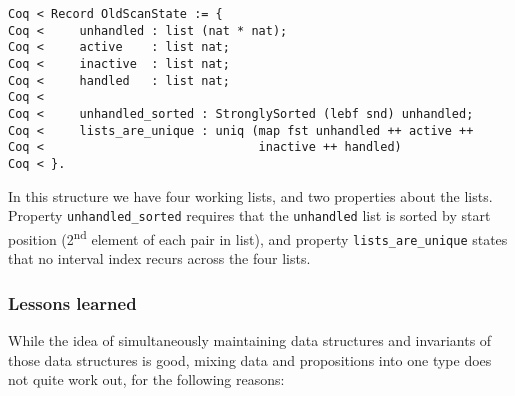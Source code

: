 \documentclass{llncs}
\begin{document}
\begin{flushleft}
\texttt{Coq~{<}~Record~OldScanState~:=~\{}\\
\texttt{Coq~{<}~~~~~unhandled~:~list~(nat~*~nat);}\\
\texttt{Coq~{<}~~~~~active~~~~:~list~nat;}\\
\texttt{Coq~{<}~~~~~inactive~~:~list~nat;}\\
\texttt{Coq~{<}~~~~~handled~~~:~list~nat;}\\
\texttt{Coq~{<}~}\\
\texttt{Coq~{<}~~~~~unhandled\_sorted~:~StronglySorted~(lebf~snd)~unhandled;}\\
\texttt{Coq~{<}~~~~~lists\_are\_unique~:~uniq~(map~fst~unhandled~++~active~++}\\
\texttt{Coq~{<}~~~~~~~~~~~~~~~~~~~~~~~~~~~~~~inactive~++~handled)}\\
\texttt{Coq~{<}~\}.}\\
\end{flushleft}

In this structure we have four working lists, and two properties about
the lists. Property \texttt{unhandled\_sorted} requires that the
\texttt{unhandled} list is sorted by start position
(2\textsuperscript{nd} element of each pair in list), and property
\texttt{lists\_are\_unique} states that no interval index recurs
across the four lists.

\subsubsection*{Lessons learned}

While the idea of simultaneously maintaining data structures and
invariants of those data structures is good, mixing data and
propositions into one type does not quite work out, for the following
reasons: 
\end{document}
